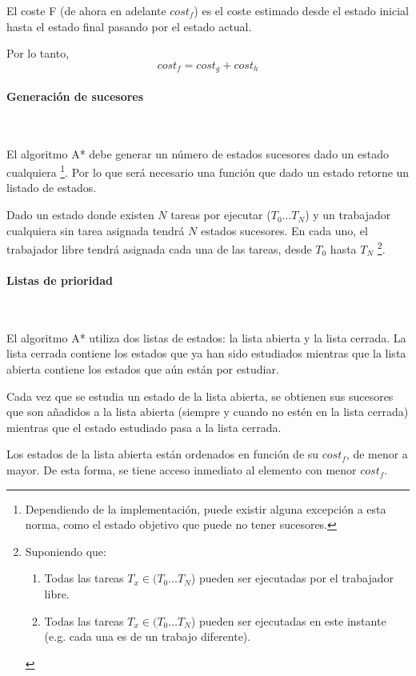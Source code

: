 El coste F (de ahora en adelante $cost_f$) es el coste estimado desde el estado inicial
hasta el estado final pasando por el estado actual.

Por lo tanto, \[cost_f = cost_g + cost_h\]

\paragraph{Generación de sucesores}~

El algoritmo A* debe generar un número de estados sucesores dado un estado cualquiera
\footnote{Dependiendo de la implementación, puede existir alguna excepción a esta norma,
como el estado objetivo que puede no tener sucesores.}.
Por lo que será necesario una función que dado un estado retorne un listado de estados.

Dado un estado donde existen $N$ tareas por ejecutar ($T_0 \dots T_N$) y
un trabajador cualquiera sin tarea asignada tendrá $N$ estados sucesores.
En cada uno, el trabajador libre tendrá asignada cada una de las tareas,
desde $T_0$ hasta $T_N$
\footnote{Suponiendo que:
\begin{enumerate}[itemsep=0.25px]
    \item Todas las tareas $T_x \in (T_0 \dots T_N$)
pueden ser ejecutadas por el trabajador libre.
    \item Todas las tareas $T_x \in (T_0 \dots T_N$)
pueden ser ejecutadas en este instante (e.g. cada una es de un trabajo diferente).
\end{enumerate}}.

\paragraph{Listas de prioridad}~

El algoritmo A* utiliza dos listas de estados: la lista abierta y la lista cerrada.
La lista cerrada contiene los estados que ya han sido estudiados mientras que
la lista abierta contiene los estados que aún están por estudiar.

Cada vez que se estudia un estado de la lista abierta,
se obtienen sus sucesores que son añadidos a la lista abierta
(siempre y cuando no estén en la lista cerrada)
mientras que el estado estudiado pasa a la lista cerrada.

Los estados de la lista abierta están ordenados en función de su $cost_f$,
de menor a mayor.
De esta forma, se tiene acceso inmediato al elemento con menor $cost_f$.

